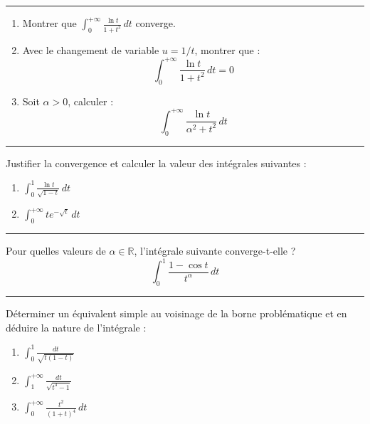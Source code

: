 \documentclass[../PolyS4.tex]{subfiles}
\begin{document}
\vspace{1em}
\hrule
\vspace{1em}


\begin{enumerate}
\item Montrer que $\displaystyle\int_{0}^{+\infty} \frac{\ln t}{1+t^{2}} \, dt$ converge.
\item Avec le changement de variable $u = 1/t$, montrer que :
$$\int_{0}^{+\infty} \frac{\ln t}{1+t^{2}} \, dt = 0$$
\item Soit $\alpha > 0$, calculer :
$$\int_{0}^{+\infty} \frac{\ln t}{\alpha^{2}+t^{2}} \, dt$$
\end{enumerate}

\vspace{1em}
\hrule
\vspace{1em}


Justifier la convergence et calculer la valeur des intégrales suivantes :

\begin{enumerate}
\item $\displaystyle\int_{0}^{1} \frac{\ln t}{\sqrt{1-t}} \, dt$
\item $\displaystyle\int_{0}^{+\infty} t e^{-\sqrt{t}} \, dt$
\end{enumerate}

\vspace{1em}
\hrule
\vspace{1em}


Pour quelles valeurs de $\alpha \in \mathbb{R}$, l'intégrale suivante converge-t-elle ?
$$\int_{0}^{1} \frac{1 - \cos t}{t^{\alpha}} \, dt$$

\vspace{1em}
\hrule
\vspace{1em}


Déterminer un équivalent simple au voisinage de la borne problématique et en déduire la nature de l'intégrale :

\begin{enumerate}
\item $\displaystyle\int_{0}^{1} \frac{dt}{\sqrt{t(1-t)}}$
\item $\displaystyle\int_{1}^{+\infty} \frac{dt}{\sqrt{t^3 - 1}}$
\item $\displaystyle\int_{0}^{+\infty} \frac{t^2}{(1+t)^4} \, dt$
\end{enumerate}
\end{document}
